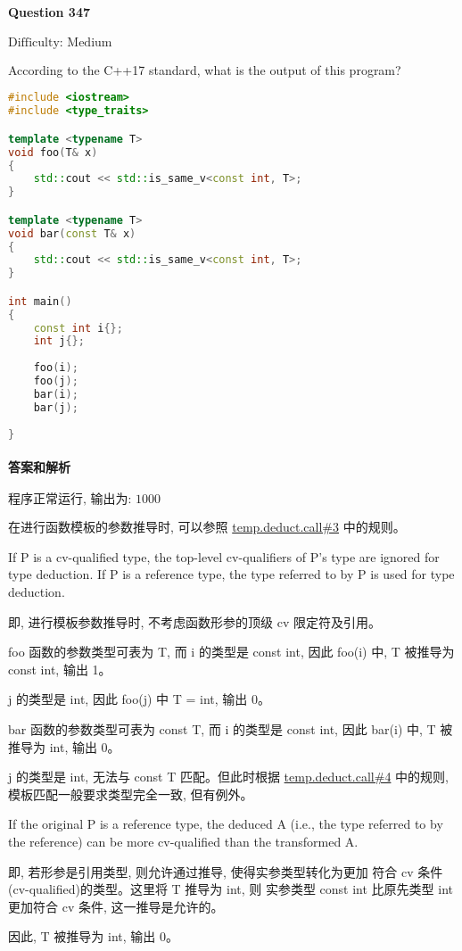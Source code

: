 \documentclass{article}
\begin{document}
	
	\paragraph*{Question 347} $\boxed{\text{Difficulty: Medium}} $			
	
	According to the C++17 standard, what is the output of this program?
	
	\begin{lstlisting}[language=C++]  		
#include <iostream>
#include <type_traits>

template <typename T>
void foo(T& x)
{
	std::cout << std::is_same_v<const int, T>;
}

template <typename T>
void bar(const T& x)
{
	std::cout << std::is_same_v<const int, T>;
}

int main()
{
	const int i{};
	int j{};
	
	foo(i);
	foo(j);
	bar(i);
	bar(j);
	
}
	\end{lstlisting}
	
	
	\paragraph*{答案和解析} $\boxed{\text{程序正常运行, 输出为: 1000}} $
	
	在进行函数模板的参数推导时, 可以参照 \href{https://timsong-cpp.github.io/cppwp/n4659/temp.deduct.call#3}{temp.deduct.call\#3} 中的规则。
	
	\begin{lightgrayleftbar}
		If P is a cv-qualified type, the top-level cv-qualifiers of P's type are ignored for type deduction. If P is a reference type, the type referred to by P is used for type deduction.
	\end{lightgrayleftbar}
	
	即, 进行模板参数推导时, 不考虑函数形参的顶级 cv 限定符及引用。
	
	foo 函数的参数类型可表为 T, 而 i 的类型是 const int, 因此 foo(i) 中, T 被推导为 const int, 输出 1。
	
	j 的类型是 int, 因此 foo(j) 中 T = int, 输出 0。
	
	bar 函数的参数类型可表为 const T, 而 i 的类型是 const int, 因此 bar(i) 中, T 被推导为 int, 输出 0。
	
	j 的类型是 int, 无法与 const T 匹配。但此时根据 \href{https://timsong-cpp.github.io/cppwp/n4659/temp.deduct.call#4}{temp.deduct.call\#4} 中的规则, 模板匹配一般要求类型完全一致, 但有例外。
	
	\begin{lightgrayleftbar}
		If the original P is a reference type, the deduced A (i.e., the type referred to by the reference) can be more cv-qualified than the transformed A. 
	\end{lightgrayleftbar}
	
	即, 若形参是引用类型, 则允许通过推导, 使得实参类型转化为更加 符合 cv 条件(cv-qualified)的类型。这里将 T 推导为 int, 则 实参类型 const int 比原先类型 int 更加符合 cv 条件, 这一推导是允许的。
	
	因此, T 被推导为 int, 输出 0。
\end{document}
